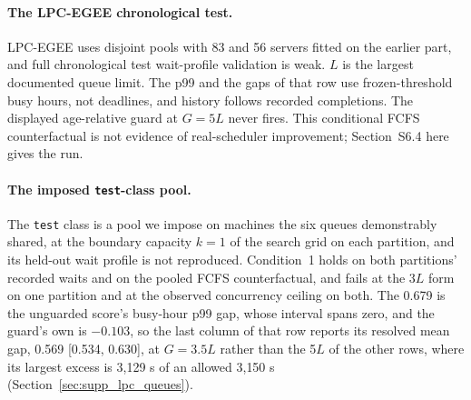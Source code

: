 \documentclass[mathematics,supfile,submit,moreauthors]{Definitions/mdpi}
\newcommand{\devnum}[1]{#1}
\begin{document}
\paragraph{The LPC-EGEE chronological test.}
LPC-EGEE \cite{lpc_egee_trace} uses disjoint pools with \devnum{83} and \devnum{56}
servers fitted on the earlier part, and full chronological test wait-profile validation
is weak. $L$ is the largest documented queue limit. The p99 and the gaps of that row use
frozen-threshold busy hours, not deadlines, and history follows recorded completions.
The displayed age-relative guard at $G=\devnum{5}L$ never fires. This conditional FCFS
counterfactual is not evidence of real-scheduler improvement; Section~S6.4 here gives
the run.

\paragraph{The imposed \texttt{test}-class pool.}
The \texttt{test} class is a pool we impose on machines the six queues demonstrably
shared, at the boundary capacity $k=\devnum{1}$ of the search grid on each partition,
and its held-out wait profile is not reproduced. Condition~1 holds on both partitions'
recorded waits and on the pooled FCFS counterfactual, and fails at the \devnum{3}$L$
form on one partition and at the observed concurrency ceiling on both. The
\devnum{0.679} is the unguarded score's busy-hour p99 gap, whose interval spans zero,
and the guard's own is \devnum{$-0.103$}, so the last column of that row reports its
resolved mean gap, \devnum{0.569} [\devnum{0.534}, \devnum{0.630}], at
$G = \devnum{3.5}L$ rather than the \devnum{5}$L$ of the other rows, where its largest
excess is \devnum{3{,}129} s of an allowed \devnum{3{,}150} s
(Section~\ref{sec:supp_lpc_queues}).
\end{document}
